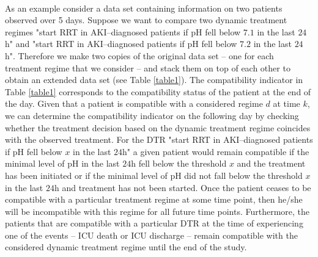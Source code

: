 \documentclass[12pt]{article}
\begin{document}
\\
\indent
As an example consider a data set containing information on two patients observed over 5 days. Suppose we want to compare two dynamic treatment regimes "start RRT in AKI--diagnosed patients if pH fell below $7.1$ in the last $24$h" and "start RRT in AKI--diagnosed patients if pH fell below $7.2$ in the last $24$h". Therefore we make two copies of the original data set -- one for each treatment regime that we consider -- and stack them on top of each other to obtain an extended data set (see Table \ref{table1}). The compatibility indicator in Table \ref{table1} corresponds to the compatibility status of the patient at the end of the day. Given that a patient is compatible with a considered regime $d$ at time $k$, we can determine the compatibility indicator on the following day by checking whether the treatment decision based on the dynamic treatment regime coincides with the observed treatment. For the DTR "start RRT in AKI--diagnosed patients if pH fell below $x$ in the last $24$h" a given patient would remain compatible if the minimal level of pH in the last $24$h fell below the threshold $x$ and the treatment has been initiated or if the minimal level of pH did not fall below the threshold $x$ in the last $24$h and treatment has not been started. Once the patient ceases to be compatible with a particular treatment regime at some time point, then he/she will be incompatible with this regime for all future time points. Furthermore, the patients that are compatible with a particular DTR at the time of experiencing one of the events -- ICU death or ICU discharge -- remain compatible with the considered dynamic treatment regime until the end of the study.
\end{document}
